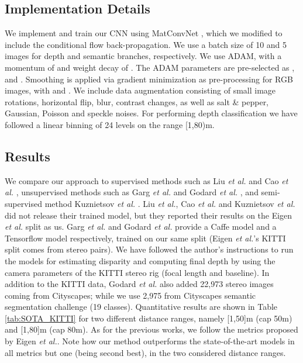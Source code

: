 \documentclass[letterpaper, 10 pt, conference]{ieeeconf}
\newcommand{\etal}{{\em et al.}}
\newcommand{\Tab}[1]{Table \ref{tab:#1}}
\begin{document}
\subsection{Implementation Details}
We implement and train our CNN using MatConvNet \cite{Vedaldi:2015}, which we modified to include the conditional flow back-propagation. We use a batch size of 10 and 5 images for depth and semantic branches, respectively. We use ADAM, with a momentum of  and weight decay of . The ADAM parameters are pre-selected as ,  and .  Smoothing is applied via  gradient minimization  \cite{Xu:2011} as pre-processing for RGB images, with  and . We include data augmentation consisting of small image rotations, horizontal flip, blur, contrast changes, as well as salt \& pepper, Gaussian, Poisson and speckle noises. For performing depth classification we have followed a linear binning of 24 levels on the range [1,80)m.

\subsection{Results}




We compare our approach to supervised methods such as Liu {\etal} \cite{Liu:2016} and Cao {\etal} \cite{Cao:2017}, unsupervised methods such as Garg {\etal} \cite{Garg:2016} and Godard {\etal} \cite{Godard:2017}, and semi-supervised method Kuznietsov {\etal} \cite{Kuznietsov:2017}. Liu {\etal}, Cao {\etal} and Kuznietsov {\etal} did not release their trained model, but they reported their results on the Eigen {\etal} split as us. Garg {\etal} and Godard {\etal} provide a Caffe model and a Tensorflow model respectively, trained on our same split (Eigen {\etal}'s KITTI split comes from stereo pairs). We have followed the author's instructions to run the models for estimating disparity and computing final depth by using the camera parameters of the KITTI stereo rig (focal length and baseline). In addition to the KITTI data, Godard {\etal} also added 22,973 stereo images coming from Cityscapes; while we use 2,975 from Cityscapes semantic segmentation challenge (19 classes). Quantitative results are shown in \Tab{SOTA_KITTI} for two different distance ranges, namely [1,50]m (cap 50m) and [1,80]m (cap 80m). As for the previous works, we follow the metrics proposed by Eigen {\etal}. Note how our method outperforms the state-of-the-art models in all metrics but one (being second best), in the two considered distance ranges. 
\end{document}
